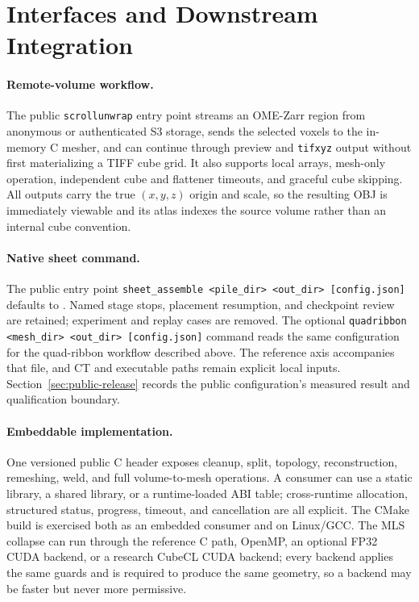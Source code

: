 \section{Interfaces and Downstream Integration}
\label{sec:integration}


\paragraph{Remote-volume workflow.} The public \texttt{scrollunwrap} entry point streams an OME-Zarr region from anonymous or authenticated S3 storage, sends the selected voxels to the in-memory C mesher, and can continue through preview and \texttt{tifxyz} output without first materializing a TIFF cube grid. It also supports local arrays, mesh-only operation, independent cube and flattener timeouts, and graceful cube skipping. All outputs carry the true $(x,y,z)$ origin and scale, so the resulting OBJ is immediately viewable and its atlas indexes the source volume rather than an internal cube convention.

\paragraph{Native sheet command.} The public entry point
\texttt{sheet\_assemble <pile\_dir> <out\_dir> [config.json]} defaults to
. Named stage stops, placement resumption, and
checkpoint review are retained; experiment and replay cases are removed.
The optional \texttt{quadribbon <mesh\_dir> <out\_dir> [config.json]} command
reads the same configuration for the quad-ribbon workflow described above.
The reference axis accompanies that file, and CT and executable paths remain
explicit local inputs. Section~\ref{sec:public-release} records the public
configuration's measured result and qualification boundary.

\paragraph{Embeddable implementation.} One versioned public C header exposes cleanup, split, topology, reconstruction, remeshing, weld, and full volume-to-mesh operations. A consumer can use a static library, a shared library, or a runtime-loaded ABI table; cross-runtime allocation, structured status, progress, timeout, and cancellation are all explicit. The CMake build is exercised both as an embedded consumer and on Linux/GCC. The MLS collapse can run through the reference C path, OpenMP, an optional FP32 CUDA backend, or a research CubeCL CUDA backend; every backend applies the same guards and is required to produce the same geometry, so a backend may be faster but never more permissive.

